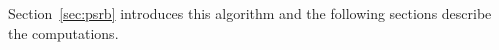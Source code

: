 \begin{enumerate}
    Section~\ref{sec:psrb} introduces this algorithm and the following sections describe the computations. 
    \end{enumerate}
